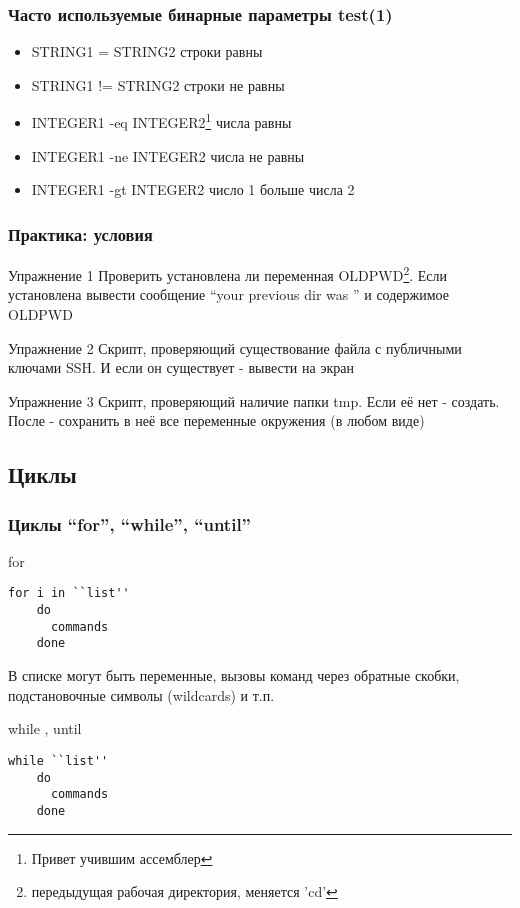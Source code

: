 \begin{frame}[fragile]
  \frametitle{Часто используемые бинарные параметры test(1)}
  \begin{itemize}
    \item \alert{STRING1 = STRING2} строки равны
    \item \alert{STRING1 != STRING2} строки не равны
    \item \alert{INTEGER1 -eq INTEGER2}\footnote{Привет учившим ассемблер} числа равны
    \item \alert{INTEGER1 -ne INTEGER2} числа не равны
    \item \alert{INTEGER1 -gt INTEGER2} число 1 больше числа 2
  \end{itemize}
\end{frame}

\begin{frame}[fragile]
  \frametitle{Практика: условия}

  \alert{Упражнение 1} Проверить установлена ли переменная OLDPWD\footnote{передыдущая рабочая директория, меняется 'cd'}. Если установлена вывести сообщение ``your previous dir was '' и содержимое OLDPWD \pause

  \alert{Упражнение 2} Скрипт, проверяющий существование файла с публичными ключами SSH. И если он существует - вывести на экран  \pause

  \alert{Упражнение 3} Скрипт, проверяющий наличие папки tmp. Если её нет - создать. После - сохранить в неё все переменные окружения (в любом виде)
\end{frame}

\subsection{Циклы}

\begin{frame}[fragile]
  \frametitle{Циклы ``for'', ``while'', ``until''}
      \alert{for}
\begin{lstlisting}[basicstyle=\normalsize]
	for i in ``list''
	do
	  commands
	done
\end{lstlisting}
      В списке могут быть переменные, вызовы команд через обратные скобки, подстановочные символы (wildcards) и т.п.\pause
  
      \alert{while , until}
\begin{lstlisting}[basicstyle=\normalsize]
	while ``list''
	do
	  commands
	done
\end{lstlisting} 
\end{frame}

